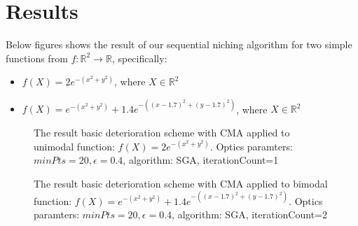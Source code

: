 \section{Results}

Below figures shows the result of our sequential niching algorithm for two
simple functions from $f:\mathbb{R}^2 \rightarrow \mathbb{R}$, specifically:
\begin{itemize}
  \item $f(X) = 2e^{-(x^2 + y^2)}$, where $X \in \mathbb{R}^2$
  \item $f(X) = e^{-(x^2 + y^2)}+1.4e^{-((x-1.7)^2 + (y-1.7)^2)}$, where $X \in
  \mathbb{R}^2$
\end{itemize}

\begin{figure}
  \centering
  \caption{The result basic deterioration scheme with CMA 
  applied to unimodal function: $f(X) = 2e^{-(x^2 +y^2)}$.
  Optics paramters: $minPts=20, \epsilon=0.4$, algorithm: SGA, iterationCount=1}
  \label{det1}
\end{figure}

\begin{figure}
  \centering
  \caption{The result basic deterioration scheme with CMA 
  applied to bimodal function: $f(X) = e^{-(x^2 + y^2)}+1.4e^{-((x-1.7)^2 +
  (y-1.7)^2)}$. Optics paramters: $minPts=20, \epsilon=0.4$, algorithm: SGA, iterationCount=2}
  \label{det2}
\end{figure}

